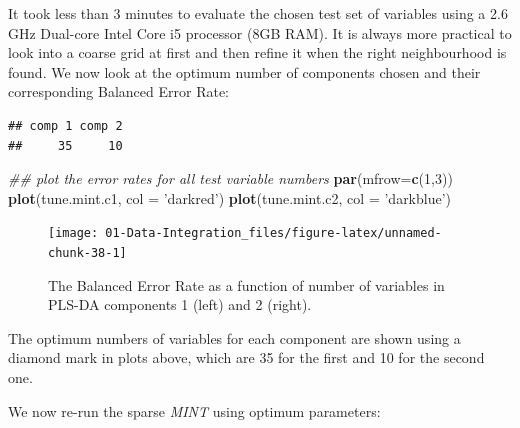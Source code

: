 \documentclass[]{book}
\newenvironment{Shaded}{\begin{snugshade}}{\end{snugshade}}
\newcommand{\CommentTok}[1]{\textcolor[rgb]{0.56,0.35,0.01}{\textit{#1}}}
\newcommand{\DataTypeTok}[1]{\textcolor[rgb]{0.13,0.29,0.53}{#1}}
\newcommand{\DecValTok}[1]{\textcolor[rgb]{0.00,0.00,0.81}{#1}}
\newcommand{\KeywordTok}[1]{\textcolor[rgb]{0.13,0.29,0.53}{\textbf{#1}}}
\newcommand{\NormalTok}[1]{#1}
\newcommand{\OperatorTok}[1]{\textcolor[rgb]{0.81,0.36,0.00}{\textbf{#1}}}
\newcommand{\StringTok}[1]{\textcolor[rgb]{0.31,0.60,0.02}{#1}}
\theoremstyle{definition}
\theoremstyle{definition}
\theoremstyle{definition}
\theoremstyle{remark}
\begin{document}
It took less than 3 minutes to evaluate the chosen test set of variables
using a 2.6 GHz Dual-core Intel Core i5 processor (8GB RAM). It is
always more practical to look into a coarse grid at first and then
refine it when the right neighbourhood is found. We now look at the
optimum number of components chosen and their corresponding Balanced
Error Rate:

\begin{Shaded}
\end{Shaded}

\begin{verbatim}
## comp 1 comp 2 
##     35     10
\end{verbatim}

\begin{Shaded}
\begin{Highlighting}[]
\CommentTok{## plot the error rates for all test variable numbers}
\KeywordTok{par}\NormalTok{(}\DataTypeTok{mfrow=}\KeywordTok{c}\NormalTok{(}\DecValTok{1}\NormalTok{,}\DecValTok{3}\NormalTok{))}
\KeywordTok{plot}\NormalTok{(tune.mint.c1, }\DataTypeTok{col =} \StringTok{'darkred'}\NormalTok{)}
\KeywordTok{plot}\NormalTok{(tune.mint.c2, }\DataTypeTok{col =} \StringTok{'darkblue'}\NormalTok{)}
\end{Highlighting}
\end{Shaded}

\begin{figure}[ht]

\texttt{[image: 01-Data-Integration\_files/figure-latex/unnamed-chunk-38-1]} \hfill{}

\caption{The Balanced Error Rate as a function of number of variables in PLS-DA components 1 (left) and 2 (right). }\label{fig:unnamed-chunk-38}
\end{figure}

The optimum numbers of variables for each component are shown using a
diamond mark in plots above, which are 35 for the first and 10 for the
second one.

We now re-run the sparse \emph{MINT} using optimum parameters:

\begin{Shaded}
\end{Shaded}
\end{document}
